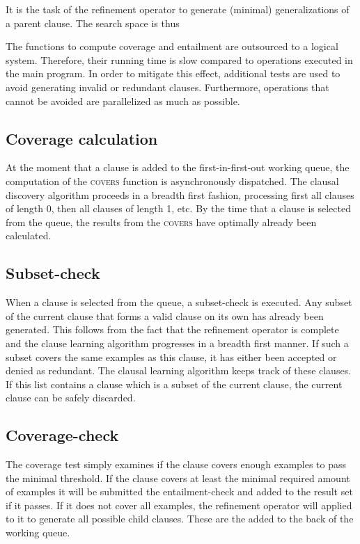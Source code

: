 It is the task of the refinement operator to generate (minimal) generalizations of a parent clause.
The search space is thus 

The functions to compute coverage and entailment are outsourced to a logical system.
Therefore, their running time is slow compared to operations executed in the main program.
In order to mitigate this effect, additional tests are used to avoid generating invalid or redundant clauses.
Furthermore, operations that cannot be avoided are parallelized as much as possible.

\subsection{Coverage calculation}
At the moment that a clause is added to the first-in-first-out working queue, the computation of the \textsc{covers} function is asynchronously dispatched.
The clausal discovery algorithm proceeds in a breadth first fashion, processing first all clauses of length 0, then all clauses of length 1, etc.
By the time that a clause is selected from the queue, the results from the \textsc{covers} have optimally already been calculated.

\subsection{Subset-check}
When a clause is selected from the queue, a subset-check is executed.
Any subset of the current clause that forms a valid clause on its own has already been generated.
This follows from the fact that the refinement operator is complete and the clause learning algorithm progresses in a breadth first manner.
If such a subset covers the same examples as this clause, it has either been accepted or denied as redundant.
The clausal learning algorithm keeps track of these clauses.
If this list contains a clause which is a subset of the current clause, the current clause can be safely discarded.

\subsection{Coverage-check}
The coverage test simply examines if the clause covers enough examples to pass the minimal threshold.
If the clause covers at least the minimal required amount of examples it will be submitted the entailment-check and added to the result set if it passes.
If it does not cover all examples, the refinement operator will applied to it to generate all possible child clauses.
These are the added to the back of the working queue.


